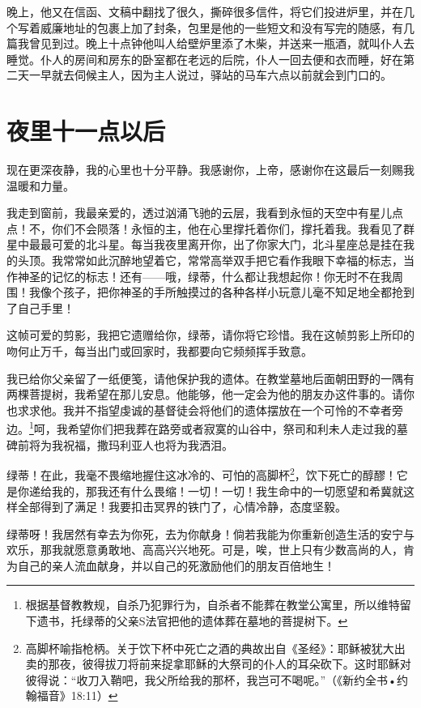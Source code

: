 \documentclass[12pt,oneside]{book}
\begin{document}
\begin{framed}
晚上，他又在信函、文稿中翻找了很久，撕碎很多信件，将它们投进炉里，并在几个写着威廉地址的包裹上加了封条，包里是他的一些短文和没有写完的随感，有几篇我曾见到过。晚上十点钟他叫人给壁炉里添了木柴，并送来一瓶酒，就叫仆人去睡觉。仆人的房间和房东的卧室都在老远的后院，仆人一回去便和衣而睡，好在第二天一早就去伺候主人，因为主人说过，驿站的马车六点以前就会到门口的。
\end{framed}

\chapter{夜里十一点以后}
\label{sec-5-4}
现在更深夜静，我的心里也十分平静。我感谢你，上帝，感谢你在这最后一刻赐我温暖和力量。

我走到窗前，我最亲爱的，透过汹涌飞驰的云层，我看到永恒的天空中有星儿点点！不，你们不会陨落！永恒的主，他在心里撑托着你们，撑托着我。我看见了群星中最最可爱的北斗星。每当我夜里离开你，出了你家大门，北斗星座总是挂在我的头顶。我常常如此沉醉地望着它，常常高举双手把它看作我眼下幸福的标志，当作神圣的记忆的标志！还有——哦，绿蒂，什么都让我想起你！你无时不在我周围！我像个孩子，把你神圣的手所触摸过的各种各样小玩意儿毫不知足地全都抢到了自己手里！

这帧可爱的剪影，我把它遗赠给你，绿蒂，请你将它珍惜。我在这帧剪影上所印的吻何止万千，每当出门或回家时，我都要向它频频挥手致意。

我已给你父亲留了一纸便笺，请他保护我的遗体。在教堂墓地后面朝田野的一隅有两棵菩提树，我希望在那儿安息。他能够，他一定会为他的朋友办这件事的。请你也求求他。我并不指望虔诚的基督徒会将他们的遗体摆放在一个可怜的不幸者旁边。\footnote{根据基督教教规，自杀乃犯罪行为，自杀者不能葬在教堂公寓里，所以维特留下遗书，托绿蒂的父亲S法官把他的遗体葬在墓地的菩提树下。}呵，我希望你们把我葬在路旁或者寂寞的山谷中，祭司和利未人走过我的墓碑前将为我祝福，撒玛利亚人也将为我洒泪。

绿蒂！在此，我毫不畏缩地握住这冰冷的、可怕的高脚杯\footnote{高脚杯喻指枪柄。关于饮下杯中死亡之酒的典故出自《圣经》：耶稣被犹大出卖的那夜，彼得拔刀将前来捉拿耶稣的大祭司的仆人的耳朵砍下。这时耶稣对彼得说：“收刀入鞘吧，我父所给我的那杯，我岂可不喝呢。”（《新约全书•约翰福音》18:11）}，饮下死亡的醇醪！它是你递给我的，那我还有什么畏缩！一切！一切！我生命中的一切愿望和希冀就这样全部得到了满足！我要扣击冥界的铁门了，心情冷静，态度坚毅。

绿蒂呀！我居然有幸去为你死，去为你献身！倘若我能为你重新创造生活的安宁与欢乐，那我就愿意勇敢地、高高兴兴地死。可是，唉，世上只有少数高尚的人，肯为自己的亲人流血献身，并以自己的死激励他们的朋友百倍地生！
\end{document}
